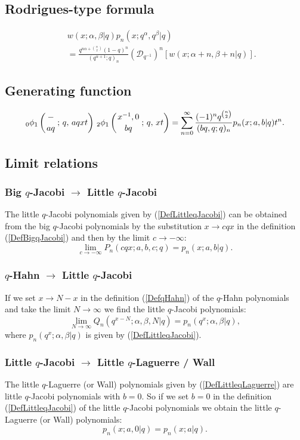 \documentclass[envcountchap,graybox]{svmono}
\newcounter{rom}
\newcommand{\qhyp}[5]{\mbox{}_{#1}{\phi}_{#2}
\left(\genfrac{}{}{0pt}{}{#3}{#4}\,;\,q,\,#5\right)}
\begin{document}
\subsection*{Rodrigues-type formula}
\begin{eqnarray}
\label{RodLittleqJacobi}
& &w(x;\alpha,\beta|q)p_n(x;q^{\alpha},q^{\beta}|q)\nonumber\\
& &{}=\frac{q^{n\alpha+\binom{n}{2}}(1-q)^n}{(q^{\alpha+1};q)_n}
\left(\mathcal{D}_{q^{-1}}\right)^n\left[w(x;\alpha+n,\beta+n|q)\right].
\end{eqnarray}

\subsection*{Generating function}
\begin{equation}
\label{GenLittleqJacobi}
\qhyp{0}{1}{-}{aq}{aqxt}\,\qhyp{2}{1}{x^{-1},0}{bq}{xt}=\sum_{n=0}^{\infty}
\frac{(-1)^nq^{\binom{n}{2}}}{(bq,q;q)_n}p_n(x;a,b|q)t^n.
\end{equation}

\subsection*{Limit relations}

\subsubsection*{Big $q$-Jacobi $\rightarrow$ Little $q$-Jacobi}
The little $q$-Jacobi polynomials given by (\ref{DefLittleqJacobi}) can be obtained
from the big $q$-Jacobi polynomials by the substitution $x\rightarrow cqx$ in the definition
(\ref{DefBigqJacobi}) and then by the limit $c\rightarrow -\infty$:
$$\lim_{c\rightarrow -\infty}P_n(cqx;a,b,c;q)=p_n(x;a,b|q).$$

\subsubsection*{$q$-Hahn $\rightarrow$ Little $q$-Jacobi}
If we set $x\rightarrow N-x$ in the definition (\ref{DefqHahn}) of the $q$-Hahn
polynomials and take the limit $N\rightarrow\infty$ we find the little $q$-Jacobi polynomials:
$$\lim _{N\rightarrow\infty} Q_n(q^{x-N};\alpha,\beta,N|q)=p_n(q^x;\alpha,\beta|q),$$
where $p_n(q^x;\alpha,\beta|q)$ is given by (\ref{DefLittleqJacobi}).

\subsubsection*{Little $q$-Jacobi $\rightarrow$ Little $q$-Laguerre / Wall}
The little $q$-Laguerre (or Wall) polynomials given by (\ref{DefLittleqLaguerre})
are little $q$-Jacobi polynomials with $b=0$. So if we set $b=0$ in the
definition (\ref{DefLittleqJacobi}) of the little $q$-Jacobi polynomials we
obtain the little $q$-Laguerre (or Wall) polynomials:
\begin{equation}
p_n(x;a,0|q)=p_n(x;a|q).
\end{equation}
\end{document}
